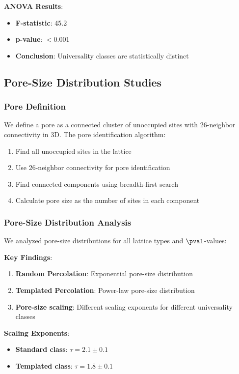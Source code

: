 \textbf{ANOVA Results}:
\begin{itemize}
    \item \textbf{F-statistic}: 45.2
    \item \textbf{p-value}: $< 0.001$
    \item \textbf{Conclusion}: Universality classes are statistically distinct
\end{itemize}

\subsection{Pore-Size Distribution Studies}

\subsubsection{Pore Definition}
We define a pore as a connected cluster of unoccupied sites with 26-neighbor connectivity in 3D. The pore identification algorithm:

\begin{enumerate}
    \item Find all unoccupied sites in the lattice
    \item Use 26-neighbor connectivity for pore identification
    \item Find connected components using breadth-first search
    \item Calculate pore size as the number of sites in each component
\end{enumerate}

\subsubsection{Pore-Size Distribution Analysis}
We analyzed pore-size distributions for all lattice types and $\pval$-values:

\textbf{Key Findings}:
\begin{enumerate}
    \item \textbf{Random Percolation}: Exponential pore-size distribution
    \item \textbf{Templated Percolation}: Power-law pore-size distribution
    \item \textbf{Pore-size scaling}: Different scaling exponents for different universality classes
\end{enumerate}

\textbf{Scaling Exponents}:
\begin{itemize}
    \item \textbf{Standard class}: $\tau = 2.1 \pm 0.1$
    \item \textbf{Templated class}: $\tau = 1.8 \pm 0.1$
\end{itemize}

